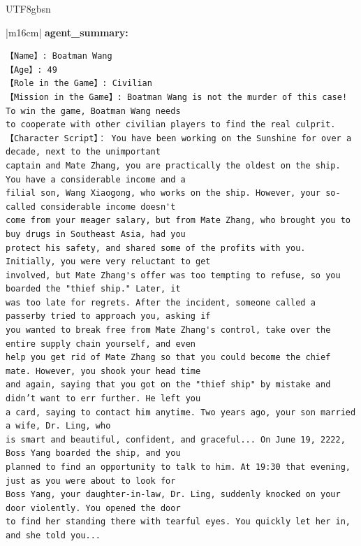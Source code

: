 \documentclass[11pt]{article}
\begin{document}
{\begin{CJK}{UTF8}{gbsn}
\begin{table}[ht!]
\centering
\begin{minipage}[t]{\linewidth}
\begin{tabular}{|m{16cm}|}
 \textbf{   agent\_summary:} \\
\begin{minipage}[t]{\linewidth}
\small\begin{verbatim}
【Name】: Boatman Wang
【Age】: 49
【Role in the Game】: Civilian
【Mission in the Game】: Boatman Wang is not the murder of this case! To win the game, Boatman Wang needs 
to cooperate with other civilian players to find the real culprit. 
【Character Script】： You have been working on the Sunshine for over a decade, next to the unimportant 
captain and Mate Zhang, you are practically the oldest on the ship. You have a considerable income and a 
filial son, Wang Xiaogong, who works on the ship. However, your so-called considerable income doesn't 
come from your meager salary, but from Mate Zhang, who brought you to buy drugs in Southeast Asia, had you 
protect his safety, and shared some of the profits with you. Initially, you were very reluctant to get 
involved, but Mate Zhang's offer was too tempting to refuse, so you boarded the "thief ship." Later, it 
was too late for regrets. After the incident, someone called a passerby tried to approach you, asking if 
you wanted to break free from Mate Zhang's control, take over the entire supply chain yourself, and even
help you get rid of Mate Zhang so that you could become the chief mate. However, you shook your head time
and again, saying that you got on the "thief ship" by mistake and didn’t want to err further. He left you 
a card, saying to contact him anytime. Two years ago, your son married a wife, Dr. Ling, who
is smart and beautiful, confident, and graceful... On June 19, 2222, Boss Yang boarded the ship, and you
planned to find an opportunity to talk to him. At 19:30 that evening, just as you were about to look for 
Boss Yang, your daughter-in-law, Dr. Ling, suddenly knocked on your door violently. You opened the door
to find her standing there with tearful eyes. You quickly let her in, and she told you...
\end{verbatim}
\end{minipage} 
\small \begin{verbatim}


\end{verbatim}
\end{tabular}
\end{minipage}
\end{table}
\end{CJK}}
\end{document}
